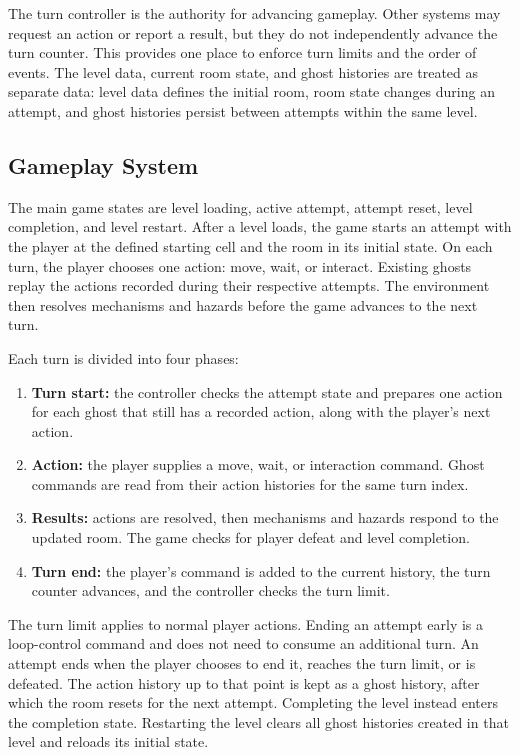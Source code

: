The turn controller is the authority for advancing gameplay. Other systems may request an action or report a result, but they do not independently advance the turn counter. This provides one place to enforce turn limits and the order of events. The level data, current room state, and ghost histories are treated as separate data: level data defines the initial room, room state changes during an attempt, and ghost histories persist between attempts within the same level.

\subsection{Gameplay System}

The main game states are level loading, active attempt, attempt reset, level completion, and level restart. After a level loads, the game starts an attempt with the player at the defined starting cell and the room in its initial state. On each turn, the player chooses one action: move, wait, or interact. Existing ghosts replay the actions recorded during their respective attempts. The environment then resolves mechanisms and hazards before the game advances to the next turn.

Each turn is divided into four phases:

\begin{enumerate}
    \item \textbf{Turn start:} the controller checks the attempt state and prepares one action for each ghost that still has a recorded action, along with the player's next action.
    \item \textbf{Action:} the player supplies a move, wait, or interaction command. Ghost commands are read from their action histories for the same turn index.
    \item \textbf{Results:} actions are resolved, then mechanisms and hazards respond to the updated room. The game checks for player defeat and level completion.
    \item \textbf{Turn end:} the player's command is added to the current history, the turn counter advances, and the controller checks the turn limit.
\end{enumerate}

The turn limit applies to normal player actions. Ending an attempt early is a loop-control command and does not need to consume an additional turn. An attempt ends when the player chooses to end it, reaches the turn limit, or is defeated. The action history up to that point is kept as a ghost history, after which the room resets for the next attempt. Completing the level instead enters the completion state. Restarting the level clears all ghost histories created in that level and reloads its initial state.

